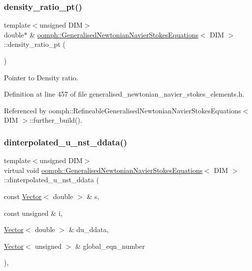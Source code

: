 \subsubsection{\texorpdfstring{density\+\_\+ratio\+\_\+pt()}{density\_ratio\_pt()}}
{\footnotesize\ttfamily template$<$unsigned D\+IM$>$ \\
double$\ast$ \& \hyperlink{classoomph_1_1GeneralisedNewtonianNavierStokesEquations}{oomph\+::\+Generalised\+Newtonian\+Navier\+Stokes\+Equations}$<$ D\+IM $>$\+::density\+\_\+ratio\+\_\+pt (\begin{DoxyParamCaption}{ }\end{DoxyParamCaption})\hspace{0.3cm}{\ttfamily [inline]}}



Pointer to Density ratio. 



Definition at line 457 of file generalised\+\_\+newtonian\+\_\+navier\+\_\+stokes\+\_\+elements.\+h.



Referenced by oomph\+::\+Refineable\+Generalised\+Newtonian\+Navier\+Stokes\+Equations$<$ D\+I\+M $>$\+::further\+\_\+build().

\mbox{\label{classoomph_1_1GeneralisedNewtonianNavierStokesEquations_a063505006e63d4a65f90f7a6409a9401}} 
\subsubsection{\texorpdfstring{dinterpolated\+\_\+u\+\_\+nst\+\_\+ddata()}{dinterpolated\_u\_nst\_ddata()}}
{\footnotesize\ttfamily template$<$unsigned D\+IM$>$ \\
virtual void \hyperlink{classoomph_1_1GeneralisedNewtonianNavierStokesEquations}{oomph\+::\+Generalised\+Newtonian\+Navier\+Stokes\+Equations}$<$ D\+IM $>$\+::dinterpolated\+\_\+u\+\_\+nst\+\_\+ddata (\begin{DoxyParamCaption}\item[{const \hyperlink{classoomph_1_1Vector}{Vector}$<$ double $>$ \&}]{s,  }\item[{const unsigned \&}]{i,  }\item[{\hyperlink{classoomph_1_1Vector}{Vector}$<$ double $>$ \&}]{du\+\_\+ddata,  }\item[{\hyperlink{classoomph_1_1Vector}{Vector}$<$ unsigned $>$ \&}]{global\+\_\+eqn\+\_\+number }\end{DoxyParamCaption})\hspace{0.3cm}{\ttfamily [inline]}, {\ttfamily [virtual]}}



